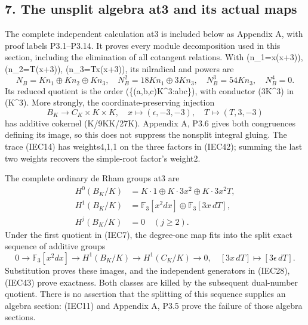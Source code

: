 \documentclass[
]{article}
\begin{document}
\subsection{7. The unsplit algebra at3 and its actual
maps}\label{the-unsplit-algebra-at3-and-its-actual-maps}

The complete independent calculation at3 is included below as Appendix
A, with proof labels P3.1--P3.14. It proves every module decomposition
used in this section, including the elimination of all cotangent
relations. With (n\_1=x(x+3)), (n\_2=T(x+3)), (n\_3=Tx(x+3)), its
nilradical and powers are \[
N_B=Kn_1\oplus Kn_2\oplus Kn_3,\quad
N_B^2=18Kn_1\oplus3Kn_3,\quad
N_B^3=54Kn_3,\quad N_B^4=0.
\tag{IEC41}
\] Its reduced quotient is the order
(\{(a,b,c)\in K\^{}3:a\equiv b\equiv c\}), with conductor
(3K\^{}3) in (K\^{}3). More strongly, the coordinate-preserving
injection \[
B_K\longrightarrow C_K\times K\times K,
\quad x\mapsto(\epsilon,-3,-3),\quad T\mapsto(T,3,-3)
\tag{IEC42}
\] has additive cokernel (K/9K\oplus K/27K). Appendix A, P3.6 gives both
congruences defining its image, so this does not suppress the nonsplit
integral gluing. The trace (IEC14) has weights4,1,1 on the three factors
in (IEC42); summing the last two weights recovers the simple-root
factor's weight2.

The complete ordinary de Rham groups at3 are \[
\begin{aligned}
H^0(B_K/K)&=K\cdot1\oplus K\cdot3x^2\oplus K\cdot3x^2T,\\
H^1(B_K/K)&=\mathbb F_3[x^2dx]\oplus\mathbb F_3[3x\,dT],\\
H^j(B_K/K)&=0\quad(j\ge2).
\end{aligned}
\tag{IEC43}
\] Under the first quotient in (IEC7), the degree-one map fits into the
split exact sequence of additive groups \[
0\longrightarrow\mathbb F_3[x^2dx]
\longrightarrow H^1(B_K/K)
\longrightarrow H^1(C_K/K)\longrightarrow0,
\quad[3x\,dT]\longmapsto[3\epsilon\,dT].
\tag{IEC44}
\] Substitution proves these images, and the independent generators in
(IEC28), (IEC43) prove exactness. Both classes are killed by the
subsequent dual-number quotient. There is no assertion that the
splitting of this sequence supplies an algebra section: (IEC11) and
Appendix A, P3.5 prove the failure of those algebra sections.
\end{document}
